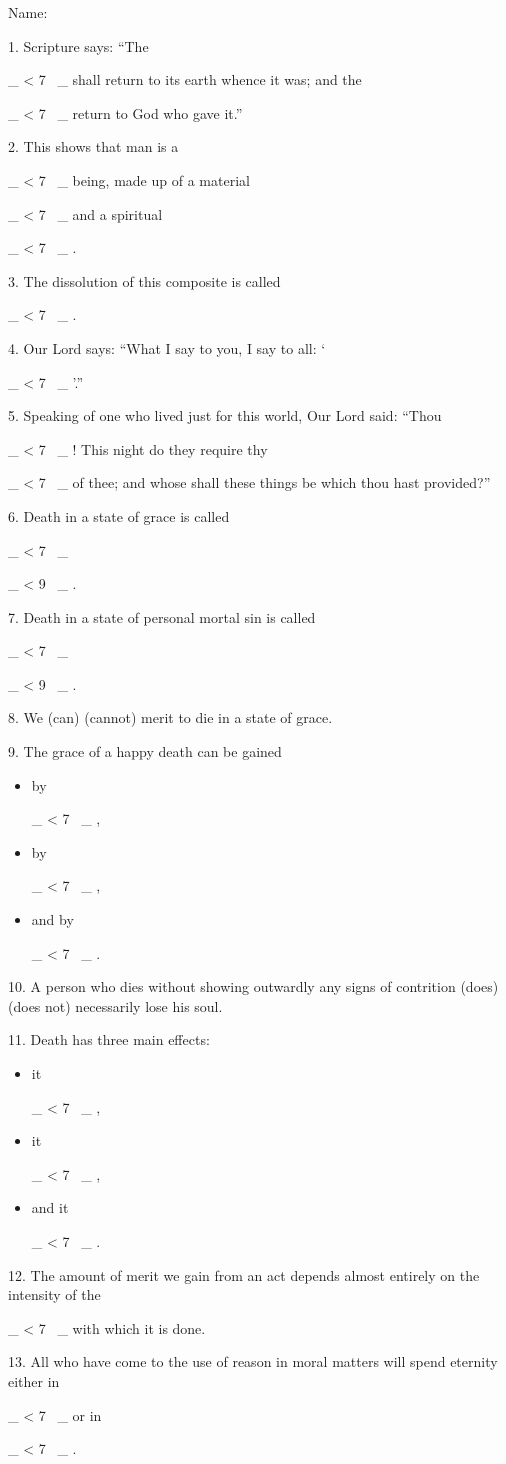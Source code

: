 \documentclass[a4paper,14pt]{memoir}
\title{}
\newcommand\textjarman[1]{{\jarman #1}}
\newcounter{z}
\newcommand\spaces[1]{\rule{0pt}{18pt} \_\loop \ifnum\value{z} < #1
~\_%
\stepcounter{z}%
\repeat%
\setcounter{z}{0}}
\begin{document}
\setlength{\parskip}{6pt plus2pt minus2pt}


\noindent Name:





1. Scripture says: ``The \spaces{7} shall return to its earth whence it was;  and
the \spaces{7} return to God who gave it.''

2. This shows that man  is  a  \spaces{7}
being, made up  of  a  material  \spaces{7}  and  a  spiritual  \spaces{7}.  

3.  The
dissolution of this composite is called \spaces{7}. 

4. Our Lord  says:  ``What  I
say to you, I say to all: `\spaces{7}'.'' 

5. Speaking of one who lived  just  for
this world, Our Lord said: “Thou \spaces{7}! This  night  do  they  require  thy
\spaces{7} of thee; and whose shall these things be which thou  hast  provided?”


6. Death in a state of grace is called \spaces{7} \spaces{9}.  

7.  Death  in  a  state  of
personal mortal sin is called \spaces{7} \spaces{9}. 

8. We (\textjarman{can}) (\textjarman{cannot}) merit to  die  in
a state of grace. 

9. The grace of a happy death can be gained 
\begin{itemize}
\item by \spaces{7},
\item by \spaces{7},
\item and by \spaces{7}.  
\end{itemize}


10. A person who dies without showing  outwardly  any
signs of contrition (\textjarman{does}) (\textjarman{does not}) necessarily lose his soul.  

11.  Death
has three main effects:
\begin{itemize}
\item it \spaces{7},
\item it \spaces{7},
\item and it  \spaces{7}.  
\end{itemize}


12. The  amount
of merit we gain from an act depends almost entirely  on  the  intensity  of
the \spaces{7} with which it is done. 

13. All  who  have  come  to  the  use  of
reason in moral matters will spend eternity either in \spaces{7} or  in  \spaces{7}.
\end{document}
